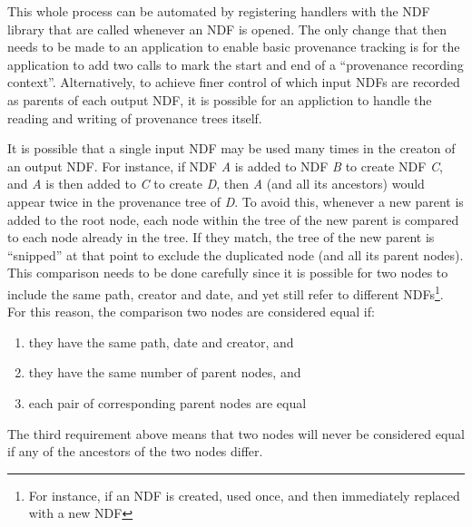 \documentclass[final,authoryear,5p,times,twocolumn]{elsarticle}
\begin{document}
This whole process can be automated by registering handlers with the NDF
library that are called whenever an NDF is opened. The only change that
then needs to be made to an application to enable basic provenance tracking is for the
application to add two calls to mark the start and end of a ``provenance
recording context''. Alternatively, to achieve finer control of which
input NDFs are recorded as parents of each output NDF, it is possible for
an appliction to handle the reading and writing of provenance trees
itself.

It is possible that a single input NDF may be used many times in the
creaton of an output NDF. For instance, if NDF \emph{A} is added to NDF
\emph{B} to create NDF \emph{C}, and \emph{A} is then added to \emph{C} to create
\emph{D}, then \emph{A} (and all its ancestors) would appear twice in the
provenance tree of \emph{D}. To avoid this, whenever a new parent is added to
the root node, each node within the tree of the new parent is compared to
each node already in the tree. If they match, the tree of the new parent
is ``snipped'' at that point to exclude the duplicated node (and all its
parent nodes). This comparison needs to be done carefully since it is
possible for two nodes to include the same path, creator and date, and
yet still refer to different NDFs\footnote{For instance, if an NDF is
created, used once, and then immediately replaced with a new NDF}. For
this reason, the comparison two nodes are considered equal if:

\begin{enumerate}
\item they have the same path, date and creator, and
\item they have the same number of parent nodes, and
\item each pair of corresponding parent nodes are equal
\end{enumerate}

The third requirement above means that two nodes will never be considered
equal if any of the ancestors of the two nodes differ.
\end{document}
